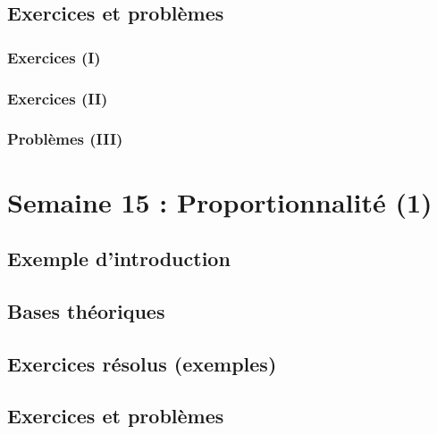 \documentclass[
  12pt,
]{book}
\begin{document}
\hypertarget{exercices-et-probluxe8mes-13}{%
\section{Exercices et problèmes}\label{exercices-et-probluxe8mes-13}}

\hypertarget{exercices-i-13}{%
\subsection{Exercices (I)}\label{exercices-i-13}}

\hypertarget{exercices-ii-13}{%
\subsection{Exercices (II)}\label{exercices-ii-13}}

\hypertarget{probluxe8mes-iii-13}{%
\subsection{Problèmes (III)}\label{probluxe8mes-iii-13}}

\hypertarget{semaine-15-proportionnalituxe9-1}{%
\chapter{Semaine 15 : Proportionnalité (1)}\label{semaine-15-proportionnalituxe9-1}}

\hypertarget{exemple-dintroduction-14}{%
\section{Exemple d'introduction}\label{exemple-dintroduction-14}}

\hypertarget{bases-thuxe9oriques-14}{%
\section{Bases théoriques}\label{bases-thuxe9oriques-14}}

\hypertarget{exercices-ruxe9solus-exemples-14}{%
\section{Exercices résolus (exemples)}\label{exercices-ruxe9solus-exemples-14}}

\hypertarget{exercices-et-probluxe8mes-14}{%
\section{Exercices et problèmes}\label{exercices-et-probluxe8mes-14}}
\end{document}
